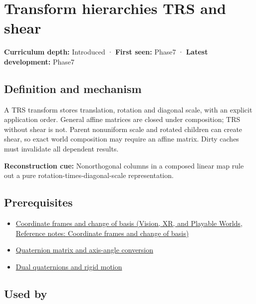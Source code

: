 \hypertarget{appendix-292c061cd47c}{}\label{referencestart:appendix-292c061cd47c}
\section{Transform hierarchies TRS and shear}\label{appendix-292c061cd47c-transform-hierarchies-trs-and-shear}

\textbf{Curriculum depth:} Introduced · \textbf{First seen:} Phase7 · \textbf{Latest development:} Phase7

\begin{allmightroledefinition}

\subsection{Definition and mechanism}\label{appendix-292c061cd47c-definition-and-mechanism}

A TRS transform stores translation, rotation and diagonal scale, with an explicit application order. General affine matrices are closed under composition; TRS without shear is not. Parent nonuniform scale and rotated children can create shear, so exact world composition may require an affine matrix. Dirty caches must invalidate all dependent results.

\end{allmightroledefinition}

\textbf{Reconstruction cue:} Nonorthogonal columns in a composed linear map rule out a pure rotation-times-diagonal-scale representation.

\subsection{Prerequisites}\label{appendix-292c061cd47c-prerequisites}

\begin{itemize}
\tightlist
\item
  \href{../07-Vision-XR-and-Playable-Worlds/main.pdf\#nameddest=appendix-1bae9457dbc3}{Coordinate frames and change of basis (Vision, XR, and Playable Worlds, Reference notes: Coordinate frames and change of basis)}
\item
  \hyperref[appendix-26d8da71f6c4]{Quaternion matrix and axis-angle conversion}
\item
  \hyperref[appendix-d1ea57347893]{Dual quaternions and rigid motion}
\end{itemize}

\subsection{Used by}\label{appendix-292c061cd47c-used-by}

